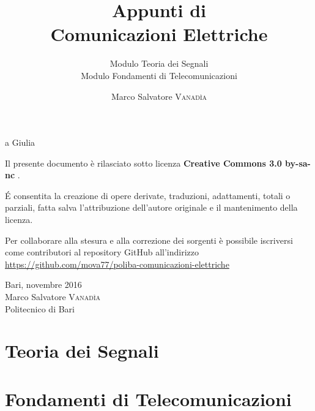\documentclass[10pt,a4paper,onecolumn,titlepage,twoside,openright,final]{book}
\title{Appunti di \\ Comunicazioni Elettriche}
\subtitle{Modulo Teoria dei Segnali\\Modulo Fondamenti di Telecomunicazioni}
\author{Marco Salvatore \textsc{Vanad\`{i}a}}
\begin{document}
\frontmatter
\maketitle
\newpage

\null{}
\begin{flushright}a Giulia\end{flushright}
\null
\vfill
Il presente documento è rilasciato sotto licenza \ccLogo \textbf{Creative Commons 3.0 by-sa-nc} \ccbyncsa.

\'{E} consentita la creazione di opere derivate, traduzioni, adattamenti, totali o parziali, fatta salva l'attribuzione dell'autore originale e il mantenimento della licenza.

Per collaborare alla stesura e alla correzione dei sorgenti è possibile iscriversi come contributori al repository GitHub all'indirizzo \url{https://github.com/mova77/poliba-comunicazioni-elettriche}

Bari, novembre 2016 \\ Marco Salvatore \textsc{Vanadìa}\\Politecnico di Bari
\cleardoublepage\clearpage{\pagestyle{empty}\cleardoublepage}

\tableofcontents

\mainmatter
\part{Teoria dei Segnali}










\part{Fondamenti di Telecomunicazioni}








{}

{}
\printindex
{}
{}
\listoffigures
{}
{}

\end{document}
